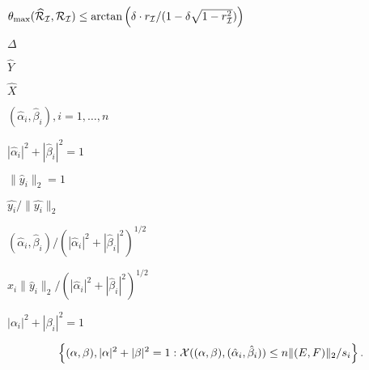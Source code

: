 {\newpage\clearpage
{}%
$\theta_{\max}({\widehat{{\cal R}}}_{\cal I},{\cal R}_{\cal I})\leq
\arctan \left(
{\delta \cdot r_{\cal I}}/{(1 - \delta \sqrt{1 - r_{\cal I}^2 })}
\right)$%
\lthtmlinlinemathZ
\lthtmlcheckvsize\clearpage}

{\newpage\clearpage
{}%
$\Delta$%
\lthtmlinlinemathZ
\lthtmlcheckvsize\clearpage}

{\newpage\clearpage
{}%
$\widehat{Y}$%
\lthtmlinlinemathZ
\lthtmlcheckvsize\clearpage}

{\newpage\clearpage
{}%
$\widehat{X}$%
\lthtmlinlinemathZ
\lthtmlcheckvsize\clearpage}

{\newpage\clearpage
{}%
$({\hat{\alpha}}_i, {\hat{\beta}}_i), i = 1, \ldots, n$%
\lthtmlinlinemathZ
\lthtmlcheckvsize\clearpage}

{\newpage\clearpage
{}%
$|\hat{\alpha}_i|^2 + |\hat{\beta}_i|^2 = 1$%
\lthtmlinlinemathZ
\lthtmlcheckvsize\clearpage}

{\newpage\clearpage
{}%
$\|\hat{y}_i\|_2 = 1$%
\lthtmlinlinemathZ
\lthtmlcheckvsize\clearpage}

{\newpage\clearpage
{}%
$\hat{y_i}/ \|\hat{y_i}\|_2$%
\lthtmlinlinemathZ
\lthtmlcheckvsize\clearpage}

{\newpage\clearpage
{}%
$({\hat{\alpha}}_i, {\hat{\beta}}_i) /
(|\hat{\alpha}_i|^2 + |\hat{\beta}_i|^2)^{1/2}$%
\lthtmlinlinemathZ
\lthtmlcheckvsize\clearpage}

{\newpage\clearpage
{}%
$\hat{x}_i \|\hat{y}_i\|_2 / (|\hat{\alpha}_i|^2 + |\hat{\beta}_i|^2)^{1/2}$%
\lthtmlinlinemathZ
\lthtmlcheckvsize\clearpage}

{\newpage\clearpage
{}%
$|{\alpha}_i|^2 + |{\beta}_i|^2 = 1$%
\lthtmlinlinemathZ
\lthtmlcheckvsize\clearpage}

{\newpage\clearpage
{}%
\begin{displaymath}
\left\{  (\alpha,\beta), |\alpha|^2 + |\beta|^2 = 1:
{\cal X}((\alpha,\beta), ({\hat{\alpha}}_i, {\hat{\beta}}_i))
\leq n \|(E,F)\|_2/ s_i \right\}.
\end{displaymath}%
\lthtmldisplayZ
\lthtmlcheckvsize\clearpage}

